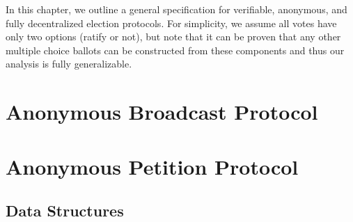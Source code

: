 In this chapter, we outline a general specification for verifiable, anonymous,
and fully decentralized election protocols. For simplicity, we assume all votes
have only two options (ratify or not), but note that it can be proven that any
other multiple choice ballots can be constructed from these components and thus
our analysis is fully generalizable.
\section{Anonymous Broadcast Protocol}
\section{Anonymous Petition Protocol}
\subsection{Data Structures}
